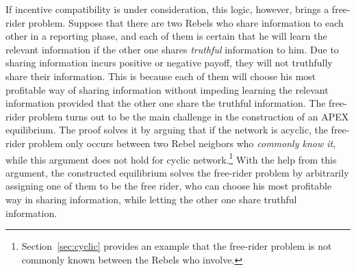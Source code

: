 \documentclass[12pt,letter]{article}
\theoremstyle{definition}
\theoremstyle{remark}
\theoremstyle{claim}
\begin{document}
If incentive compatibility is under consideration, this logic, however, brings a free-rider problem. Suppose that there are two Rebels who share information to each other in a reporting phase, and each of them is certain that he will learn the relevant information if the other one shares \textit{truthful} information to him. Due to sharing information incurs positive or negative payoff, they will not truthfully share their information. This is because each of them will choose his most profitable way of sharing information without impeding learning the relevant information provided that the other one share the truthful information. The free-rider problem turns out to be the main challenge in the construction of an APEX equilibrium. The proof solves it by arguing that if the network is acyclic, the free-rider problem only occurs between two Rebel neigbors who \textit{commonly know it}, while this argument does not hold for cyclic network.\footnote{Section~\ref{sec:cyclic} provides an example that the free-rider problem is not commonly known between the Rebels who involve.} 
With the help from this argument, the constructed equilibrium solves the free-rider problem by arbitrarily assigning one of them to be the {free rider}, who can choose his most profitable way in sharing information, while letting the other one share truthful information. 
\end{document}
